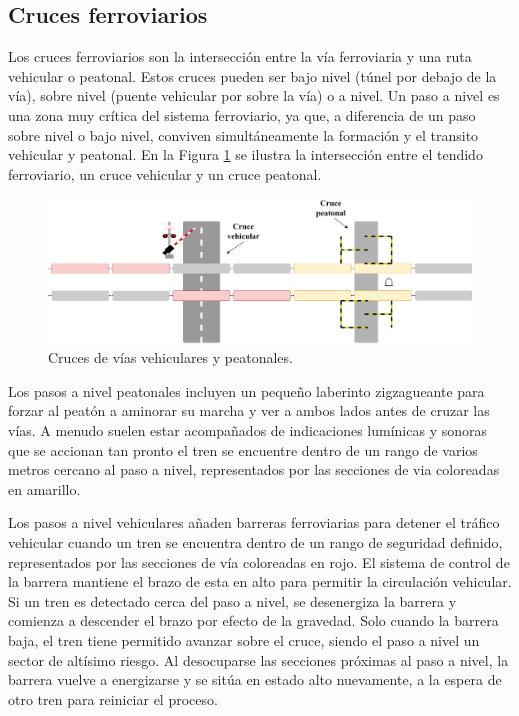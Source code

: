 \subsection{Cruces ferroviarios}
    \label{sec:crossing}
    
    Los cruces ferroviarios son la intersección entre la vía ferroviaria y una ruta vehicular o peatonal. Estos cruces pueden ser bajo nivel (túnel por debajo de la vía), sobre nivel (puente vehicular por sobre la vía) o a nivel. Un paso a nivel es una zona muy crítica del sistema ferroviario, ya que, a diferencia de un paso sobre nivel o bajo nivel, conviven simultáneamente la formación y el transito vehicular y peatonal. En la Figura \ref{fig:cruce_1} se ilustra la intersección entre el tendido ferroviario, un cruce vehicular y un cruce peatonal.
    
        \begin{figure}[H]
            \centering
            \includegraphics[width=1\textwidth]{Figuras/cruce}
            \centering\caption{Cruces de vías vehiculares y peatonales.}
            \label{fig:cruce_1}
        \end{figure}
        
    Los pasos a nivel peatonales incluyen un pequeño laberinto zigzagueante para forzar al peatón a aminorar su marcha y ver a ambos lados antes de cruzar las vías. A menudo suelen estar acompañados de indicaciones lumínicas y sonoras que se accionan tan pronto el tren se encuentre dentro de un rango de varios metros cercano al paso a nivel, representados por las secciones de via coloreadas en amarillo.
    
    Los pasos a nivel vehiculares añaden barreras ferroviarias para detener el tráfico vehicular cuando un tren se encuentra dentro de un rango de seguridad definido, representados por las secciones de vía coloreadas en rojo.  El sistema de control de la barrera mantiene el brazo de esta en alto para permitir la circulación vehicular. Si un tren es detectado cerca del paso a nivel, se desenergiza la barrera y comienza a descender el brazo por efecto de la gravedad. Solo cuando la barrera baja, el tren tiene permitido avanzar sobre el cruce, siendo el paso a nivel un sector de altísimo riesgo. Al desocuparse las secciones próximas al paso a nivel, la barrera vuelve a energizarse y se sitúa en estado alto nuevamente, a la espera de otro tren para reiniciar el proceso. 
    
